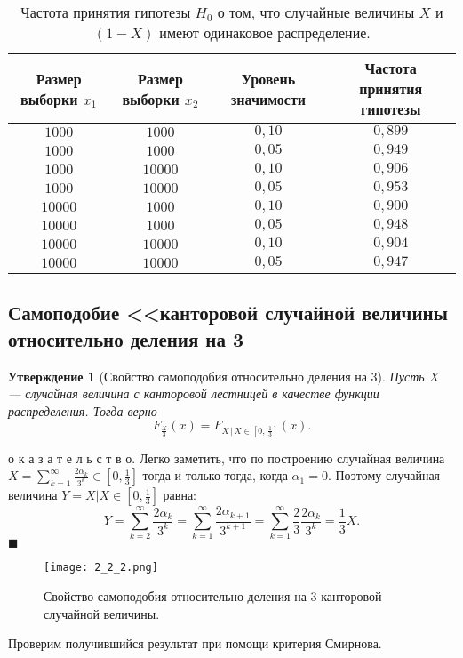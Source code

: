 \documentclass[a4paper, 11pt]{article}
\theoremstyle{def}
\theoremstyle{th}
\newtheorem{assertion}{Утверждение}[section]
\theoremstyle{rem}
\renewenvironment{proof}{\parД о к а з а т е л ь с т в о.}{\hfill$\blacksquare$}
\begin{document}
\begin{table}[h]
\begin{center}
\begin{tabular}{|c|c|c|c|}
\hline
Размер выборки $x_1$ &
Размер выборки $x_2$ &
Уровень значимости &
Частота принятия гипотезы
\\
\hline
$1000$
&
$1000$
&
$0,10$
&
$0,899$
\\
\hline
$1000$
&
$1000$
&
$0,05$
&
$0,949$
\\
\hline
$1000$
&
$10000$
&
$0,10$
&
$0,906$
\\
\hline
$1000$
&
$10000$
&
$0,05$
&
$0,953$
\\
\hline
$10000$
&
$1000$
&
$0,10$
&
$0,900$
\\
\hline
$10000$
&
$1000$
&
$0,05$
&
$0,948$
\\
\hline
$10000$
&
$10000$
&
$0,10$
&
$0,904$
\\
\hline
$10000$
&
$10000$
&
$0,05$
&
$0,947$
\\
\hline
\end{tabular}
\end{center}
\caption{Частота принятия гипотезы $H_0$ о том, что случайные величины $X$ и $(1 - X)$ имеют одинаковое распределение.}
\end{table}


\subsection{Самоподобие <<канторовой случайной величины относительно деления на 3}

\begin{assertion}[Свойство самоподобия относительно деления на 3]
        Пусть $X$ --- случайная величина с канторовой лестницей в качестве функции распределения. Тогда верно
$$
        F_{\frac{X}{3}}(x) = F_{X\,|\,X\in\left[0,\,\frac{1}{3}\right]}(x).
$$
\end{assertion}
\begin{proof}
Легко заметить, что по построению случайная величина $\displaystyle X =  \sum\limits_{k=1}^{\infty}\frac{2\alpha_k}{3^k} \in \left[0, \frac{1}{3}\right]$ тогда и только тогда, когда $\alpha_1 = 0$. Поэтому случайная величина $\displaystyle Y = X|X\in\left[0, \frac{1}{3}\right]$ равна:
$$
\displaystyle
Y = \sum\limits_{k=2}^{\infty} \frac{2\alpha_k}{3^k} = \sum\limits_{k=1}^{\infty} \frac{2\alpha_{k+1}}{3^{k+1}} = \sum\limits_{k=1}^{\infty} \frac{2}{3}\frac{2\alpha_k}{3^k} = \frac{1}{3}X. 
$$
\end{proof}
\begin{figure}[H]
        \centering
        \texttt{[image: 2\_2\_2.png]}
        \caption{Свойство самоподобия относительно деления на 3 канторовой случайной величины.}
\end{figure}
Проверим получившийся результат при помощи критерия Смирнова.
\end{document}
